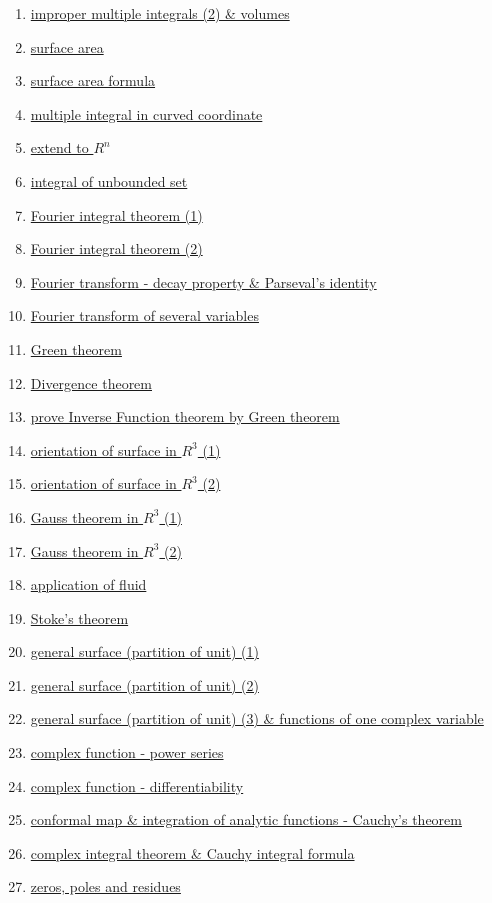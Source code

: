 \documentclass[11pt]{article}
\begin{document}
\begin{enumerate}
	\item \href{URL}{improper multiple integrals (2) \& volumes}	%
	\item \href{URL}{surface area}	%
	\item \href{URL}{surface area formula}	%
	\item \href{URL}{multiple integral in curved coordinate}	%
	\item \href{URL}{extend to $R^n$}	%
	\item \href{URL}{integral of unbounded set}	%
	\item \href{URL}{Fourier integral theorem (1)}	%
	\item \href{URL}{Fourier integral theorem (2)}	%
	\item \href{URL}{Fourier transform - decay property \& Parseval's identity}	%
	\item \href{URL}{Fourier transform of several variables}	%
	\item \href{URL}{Green theorem}	%
	\item \href{URL}{Divergence theorem}	%
	\item \href{URL}{prove Inverse Function theorem by Green theorem}	%
	\item \href{URL}{orientation of surface in $R^3$ (1)}	%
	\item \href{URL}{orientation of surface in $R^3$ (2)}	%
	\item \href{URL}{Gauss theorem in $R^3$ (1)}	%
	\item \href{URL}{Gauss theorem in $R^3$ (2)}	%
	\item \href{URL}{application of fluid}	%
	\item \href{URL}{Stoke's theorem}	%
	\item \href{URL}{general surface (partition of unit) (1)}	%
	\item \href{URL}{general surface (partition of unit) (2)}	%
	\item \href{URL}{general surface (partition of unit) (3) \& functions of one complex variable}	%
	\item \href{URL}{complex function - power series}	%
	\item \href{URL}{complex function - differentiability}	%
	\item \href{URL}{conformal map \& integration of analytic functions - Cauchy's theorem}	%
	\item \href{URL}{complex integral theorem \& Cauchy integral formula}	%
	\item \href{URL}{zeros, poles and residues}	%
\end{enumerate}
\end{document}
